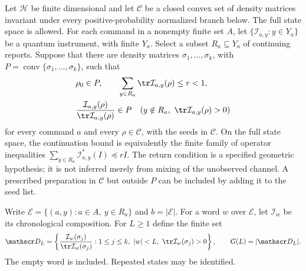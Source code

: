 Let $\mathcal H$ be finite dimensional and let $\mathcal C$ be a closed convex set
of density matrices invariant under every positive-probability normalized
branch below.  The full state space is allowed.  For each command in a nonempty
finite set $A$, let $\{\mathcal I_{a,y}:y\in Y_a\}$ be a quantum
instrument, with finite $Y_a$.  Select a subset $R_a\subseteq Y_a$ of
continuing reports.  Suppose that there are density matrices
$\sigma_1,\ldots,\sigma_k$, with
$P=\operatorname{conv}\{\sigma_1,\ldots,\sigma_k\}$, such that
\begin{equation}\label{eq:r76-return-hypotheses}
 \begin{split}
 &\rho_0\in P,\qquad
   \sum_{y\in R_a}\tr\mathcal I_{a,y}(\rho)\le r<1,\\
 &\frac{\mathcal I_{a,y}(\rho)}{\tr\mathcal I_{a,y}(\rho)}\in P
 \quad(y\notin R_a,\ \tr\mathcal I_{a,y}(\rho)>0)
 \end{split}
\end{equation}
for every command $a$ and every $\rho\in\mathcal C$, with the seeds in $\mathcal C$.
On the full state space, the continuation bound is equivalently the finite
family of operator inequalities
$\sum_{y\in R_a}\mathcal I_{a,y}^*(I)\preceq rI$.
The return condition is a specified geometric hypothesis; it is not
inferred merely from mixing of the unobserved channel.  A prescribed
preparation in $\mathcal C$ but outside $P$ can be included by adding it to the seed list.

Write $\mathcal E=\{(a,y):a\in A,\ y\in R_a\}$ and $b=|\mathcal E|$.
For a word $w$ over $\mathcal E$, let $\mathcal I_w$ be its chronological
composition.  For $L\ge1$ define the finite set
\begin{equation}\label{eq:r76-orbit-dictionary}
 \mathscr D_L=
 \left\{\frac{\mathcal I_w(\sigma_j)}{\tr\mathcal I_w(\sigma_j)}:
  1\le j\le k,\ |w|<L,\ \tr\mathcal I_w(\sigma_j)>0\right\},
 \qquad G(L)=|\mathscr D_L|.
\end{equation}
The empty word is included.  Repeated states may be identified.

